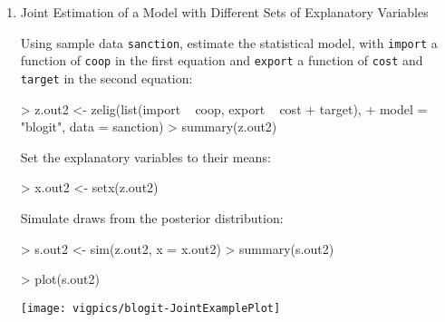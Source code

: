 \begin{enumerate}
\item {Joint Estimation of a Model with Different Sets of Explanatory Variables}\label{sto.dep.logit}

Using sample data \texttt{sanction}, estimate the statistical model, 
with {\tt import} a function of {\tt coop} in the first equation and {\tt export} a 
function of {\tt cost} and {\tt target} in the second equation:
\begin{Schunk}
\begin{Sinput}
> z.out2 <- zelig(list(import ~ coop, export ~ cost + target), 
+     model = "blogit", data = sanction)
> summary(z.out2)
\end{Sinput}
\end{Schunk}
Set the explanatory variables to their means:
\begin{Schunk}
\begin{Sinput}
> x.out2 <- setx(z.out2)
\end{Sinput}
\end{Schunk}
Simulate draws from the posterior distribution:
\begin{Schunk}
\begin{Sinput}
> s.out2 <- sim(z.out2, x = x.out2)
> summary(s.out2)
\end{Sinput}
\end{Schunk}
\begin{center}
\begin{Schunk}
\begin{Sinput}
> plot(s.out2)
\end{Sinput}
\end{Schunk}
\texttt{[image: vigpics/blogit-JointExamplePlot]}
\end{center}

%   


\end{enumerate}


